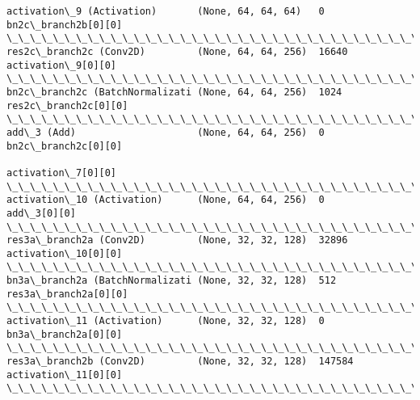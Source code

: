 \documentclass[11pt]{article}
\begin{document}
\begin{Verbatim}[commandchars=\\\{\}]
activation\_9 (Activation)       (None, 64, 64, 64)   0           bn2c\_branch2b[0][0]              
\_\_\_\_\_\_\_\_\_\_\_\_\_\_\_\_\_\_\_\_\_\_\_\_\_\_\_\_\_\_\_\_\_\_\_\_\_\_\_\_\_\_\_\_\_\_\_\_\_\_\_\_\_\_\_\_\_\_\_\_\_\_\_\_\_\_\_\_\_\_\_\_\_\_\_\_\_\_\_\_\_\_\_\_\_\_\_\_\_\_\_\_\_\_\_\_\_\_
res2c\_branch2c (Conv2D)         (None, 64, 64, 256)  16640       activation\_9[0][0]               
\_\_\_\_\_\_\_\_\_\_\_\_\_\_\_\_\_\_\_\_\_\_\_\_\_\_\_\_\_\_\_\_\_\_\_\_\_\_\_\_\_\_\_\_\_\_\_\_\_\_\_\_\_\_\_\_\_\_\_\_\_\_\_\_\_\_\_\_\_\_\_\_\_\_\_\_\_\_\_\_\_\_\_\_\_\_\_\_\_\_\_\_\_\_\_\_\_\_
bn2c\_branch2c (BatchNormalizati (None, 64, 64, 256)  1024        res2c\_branch2c[0][0]             
\_\_\_\_\_\_\_\_\_\_\_\_\_\_\_\_\_\_\_\_\_\_\_\_\_\_\_\_\_\_\_\_\_\_\_\_\_\_\_\_\_\_\_\_\_\_\_\_\_\_\_\_\_\_\_\_\_\_\_\_\_\_\_\_\_\_\_\_\_\_\_\_\_\_\_\_\_\_\_\_\_\_\_\_\_\_\_\_\_\_\_\_\_\_\_\_\_\_
add\_3 (Add)                     (None, 64, 64, 256)  0           bn2c\_branch2c[0][0]              
                                                                 activation\_7[0][0]               
\_\_\_\_\_\_\_\_\_\_\_\_\_\_\_\_\_\_\_\_\_\_\_\_\_\_\_\_\_\_\_\_\_\_\_\_\_\_\_\_\_\_\_\_\_\_\_\_\_\_\_\_\_\_\_\_\_\_\_\_\_\_\_\_\_\_\_\_\_\_\_\_\_\_\_\_\_\_\_\_\_\_\_\_\_\_\_\_\_\_\_\_\_\_\_\_\_\_
activation\_10 (Activation)      (None, 64, 64, 256)  0           add\_3[0][0]                      
\_\_\_\_\_\_\_\_\_\_\_\_\_\_\_\_\_\_\_\_\_\_\_\_\_\_\_\_\_\_\_\_\_\_\_\_\_\_\_\_\_\_\_\_\_\_\_\_\_\_\_\_\_\_\_\_\_\_\_\_\_\_\_\_\_\_\_\_\_\_\_\_\_\_\_\_\_\_\_\_\_\_\_\_\_\_\_\_\_\_\_\_\_\_\_\_\_\_
res3a\_branch2a (Conv2D)         (None, 32, 32, 128)  32896       activation\_10[0][0]              
\_\_\_\_\_\_\_\_\_\_\_\_\_\_\_\_\_\_\_\_\_\_\_\_\_\_\_\_\_\_\_\_\_\_\_\_\_\_\_\_\_\_\_\_\_\_\_\_\_\_\_\_\_\_\_\_\_\_\_\_\_\_\_\_\_\_\_\_\_\_\_\_\_\_\_\_\_\_\_\_\_\_\_\_\_\_\_\_\_\_\_\_\_\_\_\_\_\_
bn3a\_branch2a (BatchNormalizati (None, 32, 32, 128)  512         res3a\_branch2a[0][0]             
\_\_\_\_\_\_\_\_\_\_\_\_\_\_\_\_\_\_\_\_\_\_\_\_\_\_\_\_\_\_\_\_\_\_\_\_\_\_\_\_\_\_\_\_\_\_\_\_\_\_\_\_\_\_\_\_\_\_\_\_\_\_\_\_\_\_\_\_\_\_\_\_\_\_\_\_\_\_\_\_\_\_\_\_\_\_\_\_\_\_\_\_\_\_\_\_\_\_
activation\_11 (Activation)      (None, 32, 32, 128)  0           bn3a\_branch2a[0][0]              
\_\_\_\_\_\_\_\_\_\_\_\_\_\_\_\_\_\_\_\_\_\_\_\_\_\_\_\_\_\_\_\_\_\_\_\_\_\_\_\_\_\_\_\_\_\_\_\_\_\_\_\_\_\_\_\_\_\_\_\_\_\_\_\_\_\_\_\_\_\_\_\_\_\_\_\_\_\_\_\_\_\_\_\_\_\_\_\_\_\_\_\_\_\_\_\_\_\_
res3a\_branch2b (Conv2D)         (None, 32, 32, 128)  147584      activation\_11[0][0]              
\_\_\_\_\_\_\_\_\_\_\_\_\_\_\_\_\_\_\_\_\_\_\_\_\_\_\_\_\_\_\_\_\_\_\_\_\_\_\_\_\_\_\_\_\_\_\_\_\_\_\_\_\_\_\_\_\_\_\_\_\_\_\_\_\_\_\_\_\_\_\_\_\_\_\_\_\_\_\_\_\_\_\_\_\_\_\_\_\_\_\_\_\_\_\_\_\_\_

\end{Verbatim}
\end{document}
